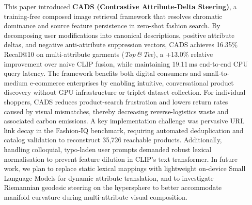 \documentclass[conference]{IEEEtran}
\begin{document}
This paper introduced \textbf{CADS (Contrastive Attribute-Delta Steering)}, a training-free composed image retrieval framework that resolves chromatic dominance and source feature persistence in zero-shot fashion search. By decomposing user modifications into canonical descriptions, positive attribute deltas, and negative anti-attribute suppression vectors, CADS achieves 16.35\% Recall@10 on multi-attribute garments (\textit{Top\,\&\,Tee}), a +13.0\% relative improvement over naive CLIP fusion, while maintaining 19.11\,ms end-to-end CPU query latency. The framework benefits both digital consumers and small-to-medium e-commerce enterprises by enabling intuitive, conversational product discovery without GPU infrastructure or triplet dataset collection. For individual shoppers, CADS reduces product-search frustration and lowers return rates caused by visual mismatches, thereby decreasing reverse-logistics waste and associated carbon emissions. A key implementation challenge was pervasive URL link decay in the Fashion-IQ benchmark, requiring automated deduplication and catalog validation to reconstruct 35{,}726 reachable products. Additionally, handling colloquial, typo-laden user prompts demanded robust lexical normalisation to prevent feature dilution in CLIP's text transformer. In future work, we plan to replace static lexical mappings with lightweight on-device Small Language Models for dynamic attribute translation, and to investigate Riemannian geodesic steering on the hypersphere to better accommodate manifold curvature during multi-attribute visual composition.
\end{document}
